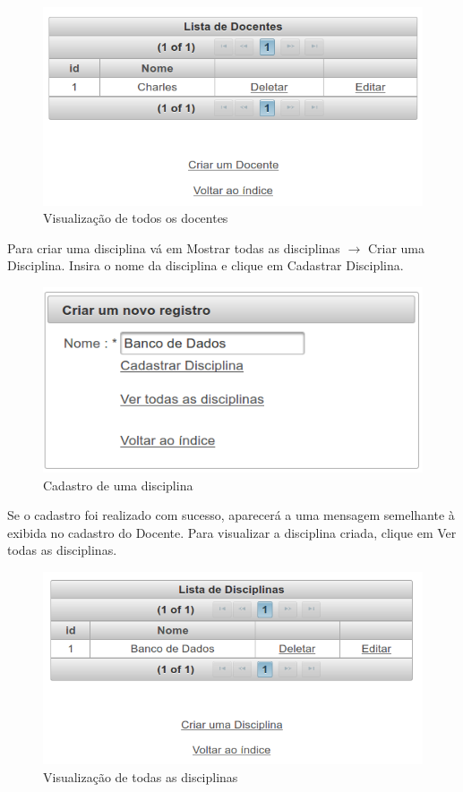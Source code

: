 \documentclass[12pt,a4paper]{article}
\begin{document}
\begin{figure}[H]
    \centering
    \includegraphics[scale=0.45]{listDocente.png}
    \caption{Visualização de todos os docentes}
    \label{listDocente}
\end{figure}

Para criar uma disciplina vá em Mostrar todas as disciplinas $\rightarrow$ Criar uma Disciplina. Insira o nome da disciplina e clique em Cadastrar Disciplina.

\begin{figure}[H]
    \centering
    \includegraphics[scale=0.45]{criarDisciplina.png}
    \caption{Cadastro de uma disciplina}
    \label{criarDisciplina}
\end{figure}

Se o cadastro foi realizado com sucesso, aparecerá a uma mensagem semelhante à exibida no cadastro do Docente. Para visualizar a disciplina criada, clique em Ver todas as disciplinas.

\begin{figure}[H]
    \centering
    \includegraphics[scale=0.45]{listDisciplina.png}
    \caption{Visualização de todas as disciplinas}
    \label{listDisciplina}
\end{figure}
 
\end{document}
